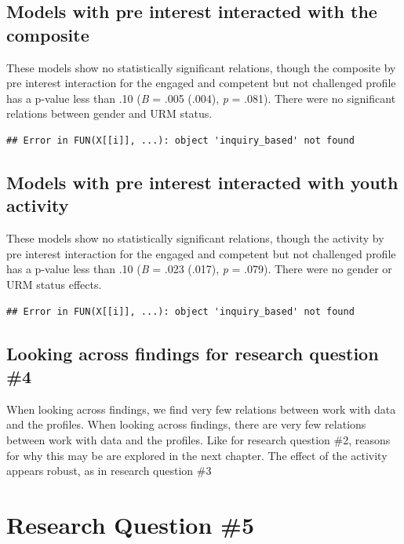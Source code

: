 \documentclass[]{msu-thesis}
\theoremstyle{definition}
\theoremstyle{definition}
\theoremstyle{definition}
\theoremstyle{remark}
\begin{document}
\subsection{Models with pre interest interacted with the
composite}\label{models-with-pre-interest-interacted-with-the-composite}

These models show no statistically significant relations, though the
composite by pre interest interaction for the engaged and competent but
not challenged profile has a p-value less than .10 (\emph{B} = .005
(.004), \emph{p} = .081). There were no significant relations between
gender and URM status.

\begin{verbatim}
## Error in FUN(X[[i]], ...): object 'inquiry_based' not found
\end{verbatim}

\subsection{Models with pre interest interacted with youth
activity}\label{models-with-pre-interest-interacted-with-youth-activity}

These models show no statistically significant relations, though the
activity by pre interest interaction for the engaged and competent but
not challenged profile has a p-value less than .10 (\emph{B} = .023
(.017), \emph{p} = .079). There were no gender or URM status effects.

\begin{verbatim}
## Error in FUN(X[[i]], ...): object 'inquiry_based' not found
\end{verbatim}

\subsection{Looking across findings for research question
\#4}\label{looking-across-findings-for-research-question-4}

When looking across findings, we find very few relations between work
with data and the profiles. When looking across findings, there are very
few relations between work with data and the profiles. Like for research
question \#2, reasons for why this may be are explored in the next
chapter. The effect of the activity appears robust, as in research
question \#3

\section{Research Question \#5}\label{research-question-5}
\end{document}
